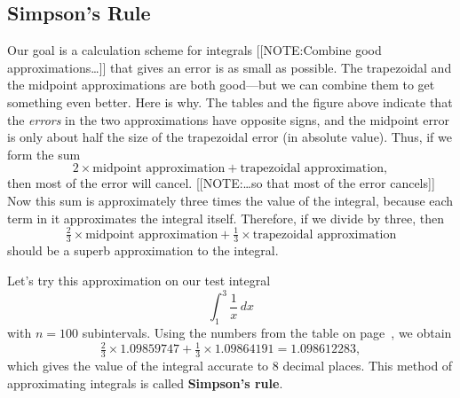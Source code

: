 \subsection{Simpson's Rule}
\label{subsec:simpsons-rule}

Our goal is a calculation scheme for integrals 
[[NOTE:Combine good approximations\ldots]]
that gives an error is as small as possible.  The trapezoidal and the
midpoint approximations are both good---but we can combine them to get
something even better.  Here is why.  The tables and the figure above
indicate that the {\em errors\/} in the two approximations have
opposite signs, and the midpoint error is only about half the size of
the trapezoidal error (in absolute value).  Thus, if we form the sum
	\[
2 \times \mbox{midpoint approximation} 
   + \mbox{trapezoidal approximation},
\]
then most of the error will cancel.  
[[NOTE:\ldots so that most of the error cancels]]
Now this sum is approximately three times the value of the integral,
because each term in it approximates the integral itself.  Therefore,
if we divide by three, then
	\[
\tfrac{2}{3} \times \mbox{midpoint approximation} + 
	\tfrac{1}{3} \times \mbox{trapezoidal approximation}
\]
should be a superb approximation to the integral.  

	Let's try this approximation on our test integral
	\[
\int_1^3 \dfrac{1}{x}\,dx
\]
with $n = 100$ subintervals.  Using the numbers from the table on
page~\pageref{trap}, we obtain
	\[
\tfrac{2}{3} \times 1.09859747 + 
	\tfrac{1}{3} \times 1.09864191 = 1.098612283,
\] 
which gives the value of the integral accurate to 8 decimal places.
This method of approximating integrals is called {\bf Simpson's
  rule}.

